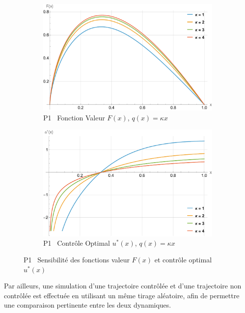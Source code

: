 \begin{figure}[htb]
    \begin{subfigure}{0.49\linewidth}
        \includegraphics[width=\linewidth]{img/validation/P1/p1_K_value.pdf}
        \caption{P1 \textemdash~Fonction Valeur $F(x)$, $q(x)=\kappa x$}\label{fig:KappaValueVisualisation1}
    \end{subfigure}
    \hfill
    \begin{subfigure}{0.49\linewidth}
        \includegraphics[width=\linewidth]{img/validation/P1/p1_K_control.pdf}
        \caption{P1 \textemdash~Contrôle Optimal $u^*(x)$, $q(x)=\kappa x$}\label{fig:KappaControlVisualisation1}
    \end{subfigure}
    \caption{P1 \textemdash~Sensibilité des fonctions valeur $F(x)$ et contrôle optimal $u^*(x)$}\label{fig:ParamSensitivityP1}
\end{figure}
\FloatBarrier Par ailleurs, une simulation d'une trajectoire contrôlée et d'une trajectoire non contrôlée est effectuée en utilisant un même tirage aléatoire, afin de permettre une comparaison pertinente entre les deux dynamiques.
